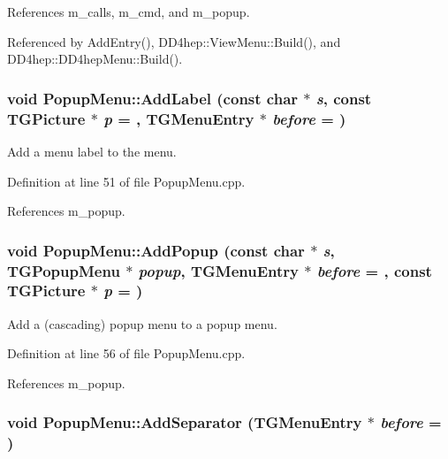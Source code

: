 References m\_\-calls, m\_\-cmd, and m\_\-popup.

Referenced by AddEntry(), DD4hep::ViewMenu::Build(), and DD4hep::DD4hepMenu::Build().\hypertarget{class_d_d4hep_1_1_popup_menu_ab142c9486f37c01153674a6749d392dd}{
\subsubsection[{AddLabel}]{\setlength{\rightskip}{0pt plus 5cm}void PopupMenu::AddLabel (const char $\ast$ {\em s}, \/  const TGPicture $\ast$ {\em p} = {}, \/  TGMenuEntry $\ast$ {\em before} = {})}}
\label{class_d_d4hep_1_1_popup_menu_ab142c9486f37c01153674a6749d392dd}


Add a menu label to the menu. 

Definition at line 51 of file PopupMenu.cpp.

References m\_\-popup.\hypertarget{class_d_d4hep_1_1_popup_menu_a8c29cafca2fe99eb2f561ed130616b7f}{
\subsubsection[{AddPopup}]{\setlength{\rightskip}{0pt plus 5cm}void PopupMenu::AddPopup (const char $\ast$ {\em s}, \/  TGPopupMenu $\ast$ {\em popup}, \/  TGMenuEntry $\ast$ {\em before} = {}, \/  const TGPicture $\ast$ {\em p} = {})}}
\label{class_d_d4hep_1_1_popup_menu_a8c29cafca2fe99eb2f561ed130616b7f}


Add a (cascading) popup menu to a popup menu. 

Definition at line 56 of file PopupMenu.cpp.

References m\_\-popup.\hypertarget{class_d_d4hep_1_1_popup_menu_a08a0c971bdb2b8783ea5bff019c64171}{
\subsubsection[{AddSeparator}]{\setlength{\rightskip}{0pt plus 5cm}void PopupMenu::AddSeparator (TGMenuEntry $\ast$ {\em before} = {})}}
\label{class_d_d4hep_1_1_popup_menu_a08a0c971bdb2b8783ea5bff019c64171}


